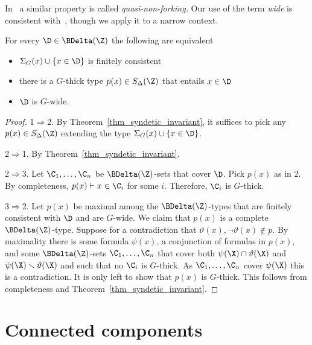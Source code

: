 In~\cite{CK} a similar property is called \textit{quasi-non-forking.}
Our use of the term \textit{wide\/} is consistent with~\cite{Hr}, though we apply it to a narrow context.

\begin{theorem}\label{thm_syndetic_invariant2}
  For every $\D\in\BDelta(\Z)$ the following are equivalent 
  \begin{itemize}
    \item[1.] $\Sigma_G(x)\cup\{x\in\D\}$ is finitely consistent
    \item[2.] there is a $G$-thick type $p(x)\in S_\Delta(\Z)$ that entails $x\in\D$
    \item[3.] $\D$ is $G$-wide.\smallskip
  \end{itemize}
\end{theorem}

\begin{proof}
  1$\Rightarrow$2.
  By Theorem~\ref{thm_syndetic_invariant}, it suffices to pick any $p(x)\in S_\Delta(\Z)$ extending the type $\Sigma_G(x)\cup\{x\in\D\}$.

  2$\Rightarrow$1.
  By Theorem~\ref{thm_syndetic_invariant}.

  2$\Rightarrow$3.
  Let $\C_1,\dots,\C_n$ be $\BDelta({\Z})$-sets that cover $\D$.
  Pick $p(x)$ as in 2.
  By completeness, $p(x)\vdash x\in\C_i$ for some $i$.
  Therefore, $\C_i$ is $G$-thick.

  3$\Rightarrow$2.
  Let $p(x)$ be maximal among the $\BDelta(\Z)$-types that are finitely consistent with $\D$ and are $G$-wide.
  We claim that $p(x)$ is a complete $\BDelta(\Z)$-type.
  Suppose for a contradiction that $\vartheta(x),\neg\vartheta(x)\notin p$.
  By maximality there is some formula $\psi(x)$, a conjunction of formulas in $p(x)$, and some $\BDelta({\Z})$-sets $\C_1,\dots,\C_n$ that cover both $\psi(\X)\cap\vartheta(\X)$ and $\psi(\X)\smallsetminus\vartheta(\X)$ and such that no $\C_i$ is $G$-thick.
  As $\C_1,\dots,\C_n$ cover $\psi(\X)$ this is a contradiction.
  It is only left to show that $p(x)$ is $G$-thick.
  This follows from completeness and Theorem~\ref{thm_syndetic_invariant}.
\end{proof}


\section{Connected components}\label{G0}
\def\medrel#1{\parbox[t]{5ex}{$\displaystyle\hfil #1$}}
\def\ceq#1#2#3{\parbox[t]{12ex}{$\displaystyle #1$}\medrel{#2}{$\displaystyle #3$}}

